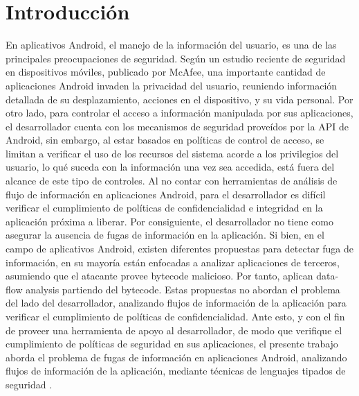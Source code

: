 \label{ch:introduccion}
\chapter{Introducción}
% 
% 

En aplicativos Android, el manejo de la información del usuario, es una de las
principales preocupaciones de seguridad. Según un estudio reciente de seguridad
en dispositivos móviles, publicado por McAfee\cite{McAfeeReport}, una importante
cantidad de aplicaciones Android invaden la privacidad del usuario, reuniendo
información detallada de su desplazamiento, acciones en el dispositivo, y su
vida personal.\newline
Por otro lado, para controlar el acceso a información manipulada por sus
aplicaciones, el desarrollador cuenta con los mecanismos de seguridad proveídos por la API de
Android, sin embargo, al estar basados en políticas de control de acceso, se
limitan a verificar el uso de los recursos del sistema acorde a los privilegios
del usuario, lo qué suceda con la información una vez sea accedida, está fuera
del alcance de este tipo de controles. Al no contar con herramientas de análisis
de flujo de información en aplicaciones Android, para el desarrollador es
difícil verificar el cumplimiento de políticas de confidencialidad e integridad
en la aplicación próxima a liberar. Por consiguiente, el desarrollador no tiene como
asegurar la ausencia de fugas de información en la aplicación.\newline
Si bien, en el campo de aplicativos Android, existen diferentes propuestas para
detectar fuga de información, en su mayoría están enfocadas a analizar
aplicaciones de terceros, asumiendo que el atacante provee bytecode malicioso.
Por tanto, aplican data-flow analysis partiendo del bytecode. Estas propuestas
no abordan el problema del lado del desarrollador, analizando flujos de
información de la aplicación para verificar el cumplimiento de políticas de
confidencialidad.\newline
Ante esto, y con el fin de proveer una herramienta de apoyo al desarrollador, de
modo que verifique el cumplimiento de políticas de seguridad en sus
aplicaciones, el presente trabajo aborda el problema de fugas de información en
aplicaciones Android, analizando flujos de información de la aplicación,
mediante técnicas de lenguajes tipados de seguridad .\newline


